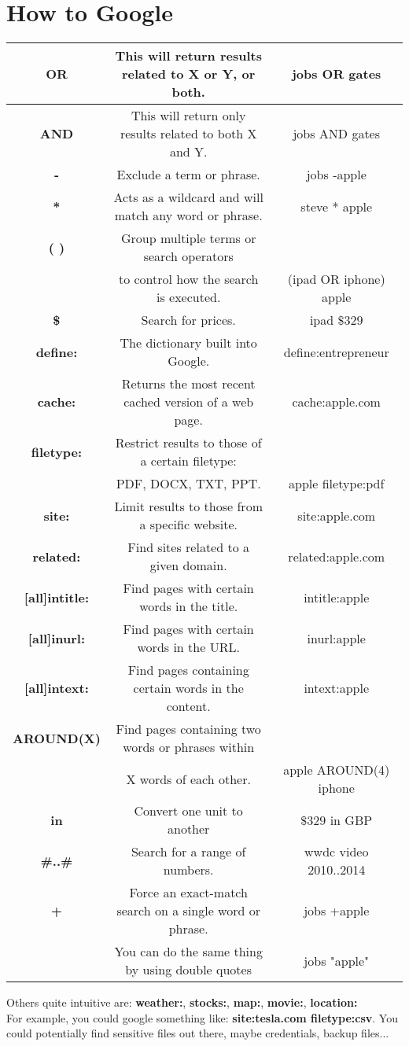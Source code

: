 \documentclass[11pt,a4paper]{article}
\begin{document}
\section{How to Google}
\begin{table}[h]
\centering
\begin{tabular}{|c|cc|}
\hline
\textbf{OR} & This will return results related to X or Y, or both. &  jobs OR gates\\
\hline
\textbf{AND} & This will return only results related to both X and Y. & jobs AND gates\\
\hline
\textbf{-} & Exclude a term or phrase. & jobs ‑apple\\
\hline
\textbf{*} & Acts as a wildcard and will match any word or phrase. & steve * apple\\
\hline
\textbf{( )} & Group multiple terms or search operators & \\& to control how the search is executed. & (ipad OR iphone) apple\\
\hline
\textbf{\$} & Search for prices. & ipad $\$329$\\
\hline
\textbf{define:} & The dictionary built into Google. & define:entrepreneur\\
\hline
\textbf{cache:} & Returns the most recent cached version of a web page. & cache:apple.com\\
\hline
\textbf{filetype:} & Restrict results to those of a certain filetype: & \\ & PDF, DOCX, TXT, PPT. & apple filetype:pdf\\
\hline
\textbf{site:} & Limit results to those from a specific website. & site:apple.com\\
\hline
\textbf{related:} & Find sites related to a given domain. & related:apple.com\\
\hline
\textbf{[all]intitle:} & Find pages with certain words in the title. & intitle:apple\\
\hline
\textbf{[all]inurl:} & Find pages with certain words in the URL. & inurl:apple\\
\hline
\textbf{[all]intext:} & Find pages containing certain words in the content. & intext:apple\\
\hline
\textbf{AROUND(X)} & Find pages containing two words or phrases within & \\ & X words of each other. & apple AROUND(4) iphone \\
\hline
\textbf{in} & Convert one unit to another & $\$329$ in GBP\\
\hline
\textbf{\#..\#} & Search for a range of numbers. & wwdc video 2010..2014 \\ 
\hline
\textbf{+} & Force an exact-match search on a single word or phrase.& jobs +apple\\& You can do the same thing by using double quotes & jobs "apple"\\
\hline

\end{tabular}
\end{table}

Others quite intuitive are: \textbf{weather:}, \textbf{stocks:}, \textbf{map:}, \textbf{movie:}, \textbf{location:}\\

For example, you could google something like: \textbf{site:tesla.com filetype:csv}. You could potentially find sensitive files out there, maybe credentials, backup files...
\end{document}
